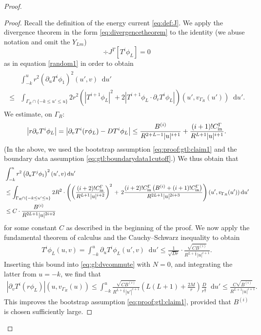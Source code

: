 \documentclass[11pt,english]{article}
\numberwithin{equation}{section}
\theoremstyle{remark}
\theoremstyle{plain}
\theoremstyle{remark}
\newcommand{\dd}{\mathop{}\!\mathrm{d}}
\newcommand{\pu}{\partial_u}
\newcommand{\pv}{\partial_v}
\renewcommand{\(}{\left(}
\renewcommand{\)}{\right)}
\begin{document}
\begin{proof}
\begin{proof}
Recall the definition of the energy current \eqref{eq:def:J}. We apply the divergence theorem in the form \eqref{eq:divergencetheorem} to the identity (we abuse notation and omit the $Y_{Lm}$)
\begin{equation}
\div J^T[T^i\phi_L]=0
\end{equation}
as in equation \eqref{random1} in order to obtain
\begin{align}\begin{split}
&\int_{-k}^u r^2 \left(\pu T^i \phi_1\right)^2(u',v)\dd u'\\
 \leq &\int_{\Gamma_R\cap \{-k\leq u' \leq u\}}2r^2 \left(\left|T^{i+1}\phi_L\right|^2+2\left|T^{i+1}\phi_L\cdot \pv T^i\phi_L\right|\right)(u', v_{\Gamma_R}(u'))\dd u'.
\end{split}\end{align}
We estimate, on $\Gamma_R$:
\[\left|r\pv T^i\phi_L\right|=\left|\pv T^i(r\phi_L)-DT^i\phi_L\right|\leq \frac{B^{(i)}}{R^{2+L-1}|u|^{i+1}}+\frac{(i+1)!\cin}{R^{L+1}|u|^{i+1}}.\]
(In the above, we used the bootstrap assumption \eqref{eq:proof:gtl:claim1} and the boundary data assumption \eqref{eq:gtl:boundarydata1cutoff}.)
We thus obtain that
\begin{align*}
&\int_{-k}^u r^2 \left(\pu T^j \phi_1\right)^2(u',v)\dd u'\\
&\leq \int_{\Gamma_R\cap \{-k\leq u' \leq u\}}2R^2
\cdot \left(\left(\frac{(i+2)!\cin}{R^{L+1}|u|^{i+2}}\right)^2\right.+\left.2\frac{(i+2)!\cin\left(B^{(i)}+(i+1)!\cin\right)}{R^{2L+1}|u|^{2i+3}}\right)(u', v_{\Gamma_R}(u'))\dd u'\\
&\leq C\cdot \frac{B^{(i)}}{R^{2L+1}|u|^{2i+2}}
\end{align*}
for some constant $C$ as described in the beginning of the proof. 
We now apply the fundamental theorem of calculus and the Cauchy--Schwarz inequality to obtain
\begin{align*}
T^i\phi_L(u,v)=\int_{-k}^u \pu T^i\phi_{L}(u',v)\dd u'\leq \frac{1}{\sqrt{Dr}}\cdot\frac{\sqrt{CB^{(i)}}}{R^{L+\frac12}|u|^{i+1}}.
\end{align*}
Inserting this bound into \eqref{eq:gl:dvcommute} with $N=0$, and integrating the latter from $u=-k$, we find that 
\begin{align}\label{eq:claim1prr}
\left|\pv T^i(r\phi_L)\right|(u,v_{\Gamma_R}(u))\leq \int_{-k}^u\frac{\sqrt{CB^{(i)}}}{R^{L+\frac12}|u'|^{i+1}}\left(L(L+1)+\frac{2M}{r}\right)\frac{D}{r^{\frac32}}\dd u'\leq \frac{C\sqrt{B^{(i)}}}{R^{L+1}|u|^{i+1}}.
\end{align}
This improves the bootstrap assumption \eqref{eq:proof:gtl:claim1}, provided that $B^{(i)}$ is chosen sufficiently large.

\end{proof}
\end{proof}
\end{document}
